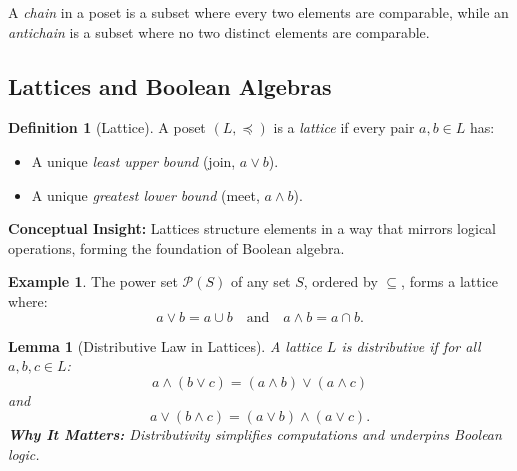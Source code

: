 \documentclass[12pt]{article}
\newtheorem{lemma}[theorem]{Lemma}
\theoremstyle{definition}
\newtheorem{definition}[theorem]{Definition}
\newtheorem{example}[theorem]{Example}
\begin{document}
A \emph{chain} in a poset is a subset where every two elements are comparable, while an \emph{antichain} is a subset where no two distinct elements are comparable.

\subsection{Lattices and Boolean Algebras}

\begin{definition}[Lattice]
  A poset \((L, \preceq)\) is a \emph{lattice} if every pair \(a,b \in L\) has:
  \begin{itemize}[itemsep=3pt]
    \item A unique \emph{least upper bound} (join, \(a \vee b\)).
    \item A unique \emph{greatest lower bound} (meet, \(a \wedge b\)).
  \end{itemize}
  \vspace{0.5em}
  \textbf{Conceptual Insight:} Lattices structure elements in a way that mirrors logical operations, forming the foundation of Boolean algebra.
\end{definition}

\begin{example}
  The power set \(\mathcal{P}(S)\) of any set \(S\), ordered by \(\subseteq\), forms a lattice where:
  \[
  a \vee b = a \cup b \quad \text{and} \quad a \wedge b = a \cap b.
  \]
\end{example}

\begin{center}
\end{center}

\begin{lemma}[Distributive Law in Lattices]
  A lattice \(L\) is \emph{distributive} if for all \(a,b,c \in L\):
  \[
  a \wedge (b \vee c) = (a \wedge b) \vee (a \wedge c)
  \]
  and
  \[
  a \vee (b \wedge c) = (a \vee b) \wedge (a \vee c).
  \]
  \vspace{0.5em}
  \textbf{Why It Matters:} Distributivity simplifies computations and underpins Boolean logic.
\end{lemma}
\end{document}
